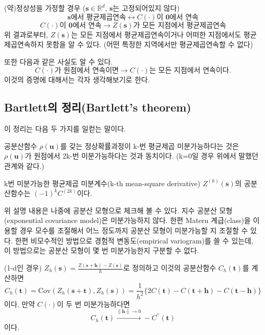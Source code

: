 \documentclass[b5paper,]{scrbook}
\theoremstyle{plain}
\theoremstyle{definition}
\numberwithin{equation}{section}
\let\BeginKnitrBlock\begin \let\EndKnitrBlock\end
\begin{document}
(약)정상성을 가정할 경우 (\(\mathbf{s} \in \mathbb{R}^{d}\), \(\mathbf{s}\)는 고정되어있지 않다)
\[ \mathbf{s} \text{에서 평균제곱연속} \leftrightarrow C(\cdot)\text{이 } \mathbf{0}\text{에서 연속}\]
\[C(\cdot)\text{이 } \mathbf{0}\text{에서 연속} \rightarrow Z(\mathbf{s})\text{가 모든 지점에서 평균제곱연속}\]
위 결과로부터, \(Z(\mathbf{s})\)는 모든 지점에서 평균제곱연속이거나 어떠한 지점에서도 평균제곱연속하지 못함을 알 수 있다. (어떤 특정한 지역에서만 평균제곱연속할 수 없다)

또한 다음과 같은 사실도 알 수 있다.
\[C(\cdot) \text{가 원점에서 연속이면} \rightarrow C(\cdot) \text{는 모든 지점에서 연속이다}.\]
이것의 증명에 대해서는 각자 생각해보기로 한다.

\hypertarget{bartlett-bartletts-theorem}{%
\subsection{Bartlett의 정리(Bartlett's theorem)}\label{bartlett-bartletts-theorem}}

이 정리는 다음 두 가지를 일컫는 말이다.

\BeginKnitrBlock{theorem}[Bartlett의 정리]
\protect\hypertarget{thm:unnamed-chunk-363}{}{\label{thm:unnamed-chunk-363} {} }공분산함수 \(\rho(\mathbf{u})\)를 갖는 정상확률과정이 k-번 평균제곱 미분가능하다는 것은 \(\rho(\mathbf{u})\)가 원점에서 2k-번 미분가능하다는 것과 동치이다. (k=0일 경우 위에서 말했던 관계와 같다.)

k번 미분가능한 평균제곱 미분계수(k-th mean-square derivative) \(Z^{(k)}(\mathbf{s})\)의 공분산함수는 \((-1)^{k}C^{(2k)}\)이다.
\EndKnitrBlock{theorem}

위 설명 내용은 나중에 공분산 모형으로 체크해 볼 수 있다. 지수 공분산 모형(exponential covariance model)은 미분가능하지 않다. 한편 Matern 계급(class)을 이용할 경우 모수를 조절해서 어느 정도까지 공분산 모형이 미분가능할 지 조절할 수 있다. 한편 비모수적인 방법으로 경험적 변동도(empirical variogram)를 쓸 수 있는데, 이 방법으로는 공분산 모형이 몇 번 미분가능한지 구분할 수 없다.

\BeginKnitrBlock{example}[Bartlett의 정리의 예]
\protect\hypertarget{exm:unnamed-chunk-364}{}{\label{exm:unnamed-chunk-364} {} }(1-d인 경우) \(Z_{h}(\mathbf{s})=\frac{Z(\mathbf{s}+\mathbf{h})-Z(\mathbf{s})}{h}\)로 정의하고 이것의 공분산함수 \(C_{h}(\mathbf{t})\)를 계산하면
\[C_{h}(\mathbf{t})=\text{Cov}(Z_{h}(\mathbf{s}+\mathbf{t}),Z_{h}(\mathbf{s}))=\frac{1}{h^{2}}\{2C(\mathbf{t})-C(\mathbf{t}+\mathbf{h})-C(\mathbf{t}-\mathbf{h})\}\]
이다. 만약 \(C(\cdot)\)이 두 번 미분가능하다면
\[C_{h}(\mathbf{t}) \stackrel{\|\mathbf{h}\| \rightarrow 0}{\rightarrow} -C^{''}(\mathbf{t})\]
이다.
\EndKnitrBlock{example}
\end{document}
